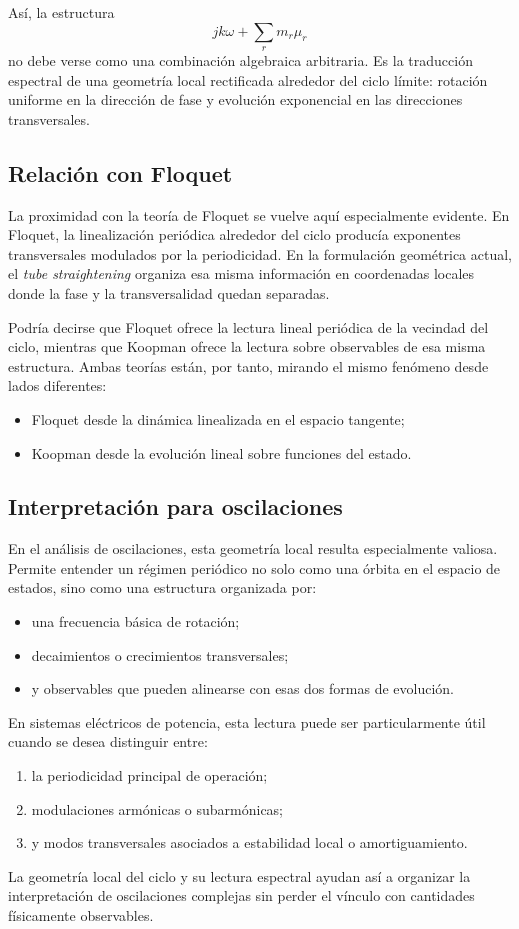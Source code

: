 Así, la estructura
\[
jk\omega+\sum_r m_r\mu_r
\]
no debe verse como una combinación algebraica arbitraria. Es la traducción espectral de una geometría local rectificada alrededor del ciclo límite: rotación uniforme en la dirección de fase y evolución exponencial en las direcciones transversales.

\subsection{Relación con Floquet}

La proximidad con la teoría de Floquet se vuelve aquí especialmente evidente. En Floquet, la linealización periódica alrededor del ciclo producía exponentes transversales modulados por la periodicidad. En la formulación geométrica actual, el \emph{tube straightening} organiza esa misma información en coordenadas locales donde la fase y la transversalidad quedan separadas.

Podría decirse que Floquet ofrece la lectura lineal periódica de la vecindad del ciclo, mientras que Koopman ofrece la lectura sobre observables de esa misma estructura. Ambas teorías están, por tanto, mirando el mismo fenómeno desde lados diferentes:
\begin{itemize}
\item Floquet desde la dinámica linealizada en el espacio tangente;
\item Koopman desde la evolución lineal sobre funciones del estado.
\end{itemize}

\subsection{Interpretación para oscilaciones}

En el análisis de oscilaciones, esta geometría local resulta especialmente valiosa. Permite entender un régimen periódico no solo como una órbita en el espacio de estados, sino como una estructura organizada por:
\begin{itemize}
\item una frecuencia básica de rotación;
\item decaimientos o crecimientos transversales;
\item y observables que pueden alinearse con esas dos formas de evolución.
\end{itemize}

En sistemas eléctricos de potencia, esta lectura puede ser particularmente útil cuando se desea distinguir entre:
\begin{enumerate}
\item la periodicidad principal de operación;
\item modulaciones armónicas o subarmónicas;
\item y modos transversales asociados a estabilidad local o amortiguamiento.
\end{enumerate}
La geometría local del ciclo y su lectura espectral ayudan así a organizar la interpretación de oscilaciones complejas sin perder el vínculo con cantidades físicamente observables.

